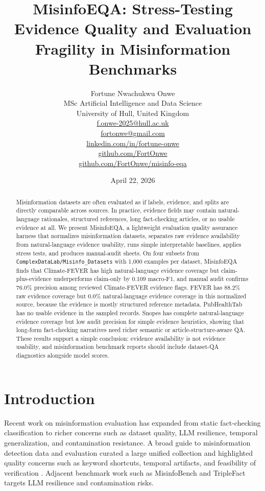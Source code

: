 \documentclass[11pt]{article}
\title{MisinfoEQA: Stress-Testing Evidence Quality and Evaluation Fragility in Misinformation Benchmarks}
\author{
Fortune Nwachukwu Onwe\\
MSc Artificial Intelligence and Data Science\\
University of Hull, United Kingdom\\
\href{mailto:f.onwe-2025@hull.ac.uk}{f.onwe-2025@hull.ac.uk}\\
\href{mailto:fortonwe@gmail.com}{fortonwe@gmail.com}\\
\href{https://www.linkedin.com/in/fortune-onwe/}{linkedin.com/in/fortune-onwe}\\
\href{https://github.com/FortOnwe}{github.com/FortOnwe}\\
\href{https://github.com/FortOnwe/misinfo-eqa}{github.com/FortOnwe/misinfo-eqa}
}
\date{April 22, 2026}
\begin{document}
\maketitle

\begin{abstract}
Misinformation datasets are often evaluated as if labels, evidence, and splits
are directly comparable across sources. In practice, evidence fields may contain
natural-language rationales, structured references, long fact-checking articles,
or no usable evidence at all. We present MisinfoEQA, a lightweight evaluation
quality assurance harness that normalizes misinformation datasets, separates raw
evidence availability from natural-language evidence usability, runs simple
interpretable baselines, applies stress tests, and produces manual-audit sheets.
On four subsets from \texttt{ComplexDataLab/Misinfo\_Datasets} with 1,000
examples per dataset, MisinfoEQA finds that Climate-FEVER has high
natural-language evidence coverage but claim-plus-evidence underperforms
claim-only by 0.109 macro-F1, and manual audit confirms 76.0\% precision among
reviewed Climate-FEVER evidence flags. FEVER has 88.2\% raw evidence coverage
but 0.0\% natural-language evidence coverage in this normalized source, because
the evidence is mostly structured reference metadata. PubHealthTab has no usable
evidence in the sampled records. Snopes has complete natural-language evidence
coverage but low audit precision for simple evidence heuristics, showing that
long-form fact-checking narratives need richer semantic or article-structure-aware
QA. These results support a simple conclusion: evidence availability is not
evidence usability, and misinformation benchmark reports should include
dataset-QA diagnostics alongside model scores.
\end{abstract}

\section{Introduction}

Recent work on misinformation evaluation has expanded from static fact-checking
classification to richer concerns such as dataset quality, LLM resilience,
temporal generalization, and contamination resistance. A broad guide to
misinformation detection data and evaluation curated a large unified collection
and highlighted quality concerns such as keyword shortcuts, temporal artifacts,
and feasibility of verification \cite{thibault2025guide,complexdatalab2025misinfo}.
Adjacent benchmark work such as MisinfoBench \cite{yang2025misinfobench} and
TripleFact \cite{xu2025triplefact} targets LLM resilience and contamination
risks.
\end{document}
